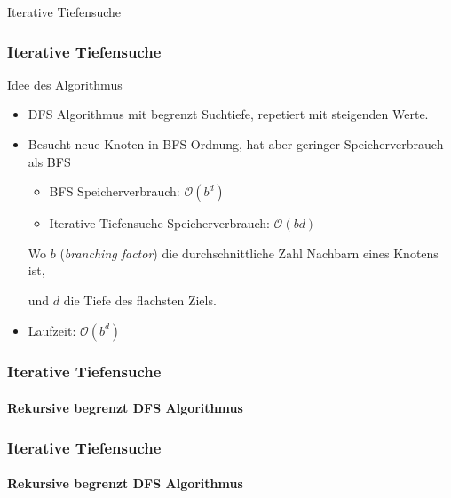 \begin{frame}
		\Huge Iterative Tiefensuche
\end{frame}
	
\begin{frame}
	\frametitle{Iterative Tiefensuche}
	\begin{KITinfoblock}{Idee des Algorithmus}
	\begin{itemize}
		\item DFS Algorithmus mit begrenzt Suchtiefe, repetiert mit steigenden Werte.
		\item Besucht neue Knoten in BFS Ordnung, hat aber geringer Speicherverbrauch als BFS
		\begin{itemize}		
			\item BFS Speicherverbrauch: $\mathcal{O}(b^d)$
			\item Iterative Tiefensuche Speicherverbrauch: $\mathcal{O}(bd)$
		\end{itemize}
		Wo $b$ (\textit{branching factor}) die durchschnittliche Zahl Nachbarn eines Knotens ist,
	
		und $d$ die Tiefe des flachsten Ziels.
		\item Laufzeit: $\mathcal{O}(b^d)$
	\end{itemize}
	\end{KITinfoblock}

\end{frame}

	
\begin{frame}
	\frametitle{Iterative Tiefensuche}
	\framesubtitle{Rekursive begrenzt DFS Algorithmus}
		
\end{frame}

\begin{frame}
	\frametitle{Iterative Tiefensuche}
	\framesubtitle{Rekursive begrenzt DFS Algorithmus}
		
\end{frame}

